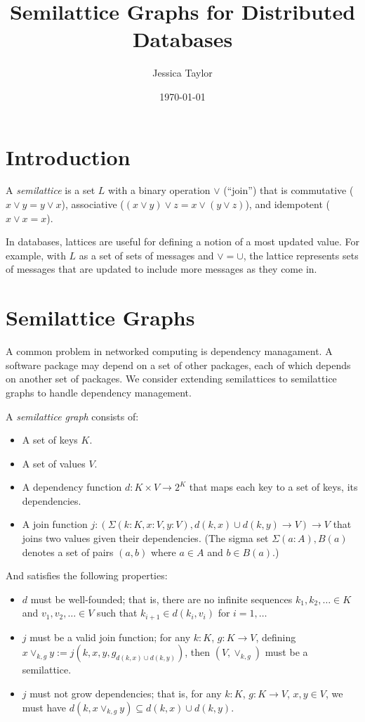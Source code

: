 \documentclass{article}
\title{Semilattice Graphs for Distributed Databases}
\author{Jessica Taylor}
\date{\today}
\begin{document}
    \maketitle
    
    \section{Introduction}
        A \emph{semilattice} is a set $L$ with a binary operation $\vee$ (``join'') that is commutative ($x \vee y = y \vee x$), associative ($(x \vee y) \vee z = x \vee (y \vee z)$), and idempotent ($x \vee x = x$).

        In databases, lattices are useful for defining a notion of a most updated value. For example, with $L$ as a set of sets of messages and $\vee = \cup$, the lattice represents sets of messages that are updated to include more messages as they come in.


    \section{Semilattice Graphs}

        A common problem in networked computing is dependency managament. A software package may depend on a set of other packages, each of which depends on another set of packages. We consider extending semilattices to semilattice graphs to handle dependency management.
        
        A \emph{semilattice graph} consists of:

        \begin{itemize}
            \item A set of keys $K$.
            \item A set of values $V$.
            \item A dependency function $d : K \times V \rightarrow 2^K$ that maps each key to a set of keys, its dependencies.
            \item A join function $j : (\Sigma (k: K, x : V, y : V), d(k, x) \cup d(k, y) \rightarrow V) \rightarrow V$ that joins two values given their dependencies. (The sigma set $\Sigma (a: A), B(a)$ denotes a set of pairs $(a, b)$ where $a \in A$ and $b \in B(a)$.)
        \end{itemize}

        And satisfies the following properties:

        \begin{itemize}
            \item $d$ must be well-founded; that is, there are no infinite sequences $k_1, k_2, \ldots \in K$ and $v_1, v_2, \ldots \in V$ such that $k_{i+1} \in d(k_i, v_i)$ for $i = 1, \ldots$
            \item $j$ must be a valid join function; for any $k : K$, $g: K \rightarrow V$, defining $x \vee_{k,g} y := j(k, x, y, g_{d(k, x) \cup d(k, y)})$, then $(V, \vee_{k,g})$ must be a semilattice.
            \item $j$ must not grow dependencies; that is, for any $k : K$, $g: K \rightarrow V$, $x, y \in V$, we must have $d(k, x \vee_{k, g} y) \subseteq d(k, x) \cup d(k, y)$.
        \end{itemize}
\end{document}
